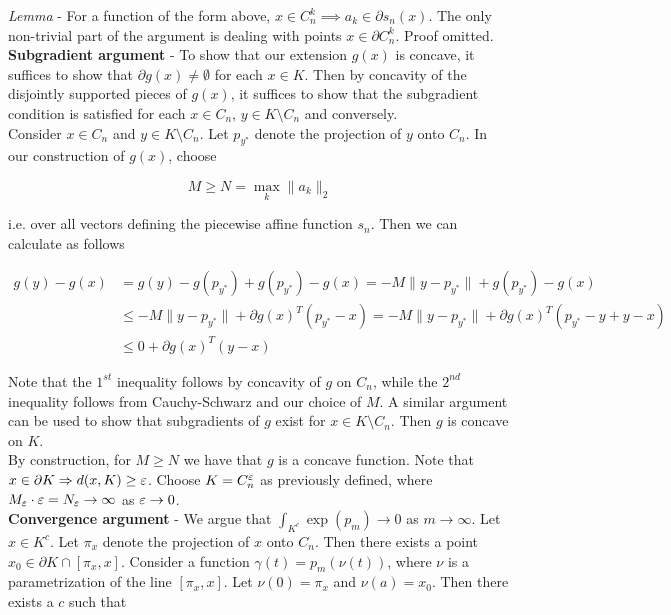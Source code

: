 \documentclass[11pt,reqno]{amsart}
\numberwithin{equation}{section}
\newcommand{\tb}{\textbf}
\newcommand{\pa}{\partial}
\begin{document}
\emph{Lemma} - For a function of the form above, $x \in C_n^k \implies a_k \in \pa s_n(x)$. The only non-trivial part of the argument is dealing with points $x \in \pa C_n^k$. Proof omitted. \\

\tb{Subgradient argument} - To show that our extension $g(x)$ is concave, it suffices to show that $\pa g(x) \not = \emptyset$ for each $x \in K$. Then by concavity of the disjointly supported pieces of $g(x)$, it suffices to show that the subgradient condition is satisfied for each $x \in C_n$, $y \in K \setminus C_n$ and conversely. \\

Consider $x \in C_n$ and $y \in K \setminus C_n$. Let $p_{y^*}$ denote the projection of $y$ onto $C_n$. In our construction of $g(x)$, choose 

\[
M \geq N = \max_{k} \|a_k\|_2 
\]

i.e. over all vectors defining the piecewise affine function $s_n$. Then we can calculate as follows 

\begin{align*}
g(y) - g(x) &= g(y) - g(p_{y^*}) + g(p_{y^*}) - g(x) = -M \|y - p_{y^*}\| + g(p_{y^*}) - g(x) \\
&\leq -M \|y - p_{y^*}\| + \pa g(x)^T(p_{y^*} - x) = -M \|y - p_{y^*}\| + \pa g(x)^T(p_{y^*} - y +y - x) \\
&\leq 0 + \pa g(x)^T(y - x) 
\end{align*}

Note that the $1^{st}$ inequality follows by concavity of $g$ on $C_n$, while the $2^{nd}$ inequality follows from Cauchy-Schwarz and our choice of $M$. A similar argument can be used to show that subgradients of $g$ exist for $x \in K \setminus C_n$. Then $g$ is concave on $K$. \\

By construction, for $M \geq N$ we have that $g$ is a concave function. Note that $x \in \pa K \implies d(x,K) \geq \eps$. Choose $K = C_n^{\varepsilon}$ as previously defined, where $M_{\varepsilon} \cdot \varepsilon = N_{\varepsilon} \rightarrow \infty$ as $\varepsilon \rightarrow 0$.\\

\tb{Convergence argument} - We argue that $\int_{K^c} \exp(p_m) \to 0$ as $m \to \infty$. Let $x \in K^c$. Let $\pi_x$ denote the projection of $x$ onto $C_n$. Then there exists a point $x_0 \in \pa K \cap [\pi_x, x]$. Consider a function $\gamma(t) = p_m(\nu(t))$, where $\nu$ is a parametrization of the line $[\pi_x, x]$. Let $\nu(0) = \pi_x$ and $\nu(a) = x_0$. Then there exists a $c$ such that \\
\end{document}
